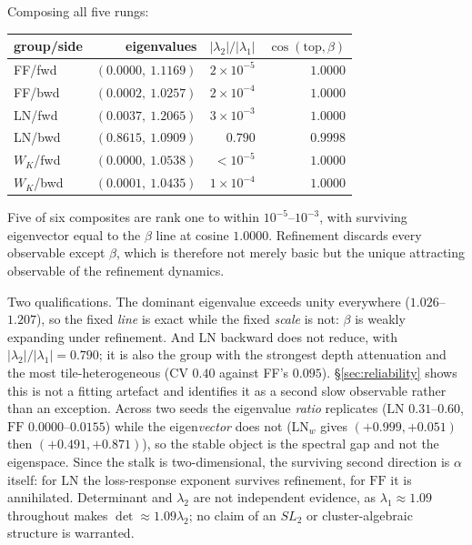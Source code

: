Composing all five rungs:

\begin{center}
\begin{tabular}{lrrr}
\toprule
group/side & eigenvalues & $|\lambda_2|/|\lambda_1|$ & $\cos(\text{top}, \beta)$ \\
\midrule
FF/fwd    & $(0.0000,\ 1.1169)$ & $2\times10^{-5}$ & $1.0000$ \\
FF/bwd    & $(0.0002,\ 1.0257)$ & $2\times10^{-4}$ & $1.0000$ \\
LN/fwd    & $(0.0037,\ 1.2065)$ & $3\times10^{-3}$ & $1.0000$ \\
LN/bwd    & $(0.8615,\ 1.0909)$ & $0.790$          & $0.9998$ \\
$W_K$/fwd & $(0.0000,\ 1.0538)$ & $<10^{-5}$       & $1.0000$ \\
$W_K$/bwd & $(0.0001,\ 1.0435)$ & $1\times10^{-4}$ & $1.0000$ \\
\bottomrule
\end{tabular}
\end{center}

\begin{proposition}
Five of six composites are rank one to within $10^{-5}$--$10^{-3}$, with
surviving eigenvector equal to the $\beta$ line at cosine $1.0000$. Refinement
discards every observable except $\beta$, which is therefore not merely basic
but the unique attracting observable of the refinement dynamics.
\end{proposition}

Two qualifications. The dominant eigenvalue exceeds unity everywhere
($1.026$--$1.207$), so the fixed \emph{line} is exact while the fixed
\emph{scale} is not: $\beta$ is weakly expanding under refinement. And
$\mathrm{LN}$ backward does not reduce, with
$|\lambda_2|/|\lambda_1| = 0.790$; it is also the group with the strongest
depth attenuation and the most tile-heterogeneous (CV $0.40$ against FF's
$0.095$). \S\ref{sec:reliability} shows this is not a fitting artefact and
identifies it as a second slow observable rather than an exception. Across two
seeds the eigenvalue \emph{ratio} replicates ($\mathrm{LN}$ $0.31$--$0.60$,
$\mathrm{FF}$ $0.0000$--$0.0155$) while the eigen\emph{vector} does not
($\mathrm{LN}_w$ gives $(+0.999,+0.051)$ then $(+0.491,+0.871)$), so the stable
object is the spectral gap and not the eigenspace. Since the stalk is
two-dimensional, the surviving second direction is $\alpha$ itself: for
$\mathrm{LN}$ the loss-response exponent survives refinement, for
$\mathrm{FF}$ it is annihilated. Determinant and $\lambda_2$ are not
independent evidence, as $\lambda_1 \approx 1.09$ throughout makes
$\det \approx 1.09\lambda_2$; no claim of an $SL_2$ or cluster-algebraic
structure is warranted.

